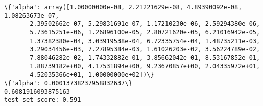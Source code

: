 \documentclass[11pt]{article}
\begin{document}
    \begin{Verbatim}[commandchars=\\\{\}]
\{'alpha': array([1.00000000e-08, 2.21221629e-08, 4.89390092e-08, 1.08263673e-07,
       2.39502662e-07, 5.29831691e-07, 1.17210230e-06, 2.59294380e-06,
       5.73615251e-06, 1.26896100e-05, 2.80721620e-05, 6.21016942e-05,
       1.37382380e-04, 3.03919538e-04, 6.72335754e-04, 1.48735211e-03,
       3.29034456e-03, 7.27895384e-03, 1.61026203e-02, 3.56224789e-02,
       7.88046282e-02, 1.74332882e-01, 3.85662042e-01, 8.53167852e-01,
       1.88739182e+00, 4.17531894e+00, 9.23670857e+00, 2.04335972e+01,
       4.52035366e+01, 1.00000000e+02])\}
\{'alpha': 0.00013738237958832637\}
0.6081916093875163
test-set score: 0.591

    \end{Verbatim}
\end{document}
